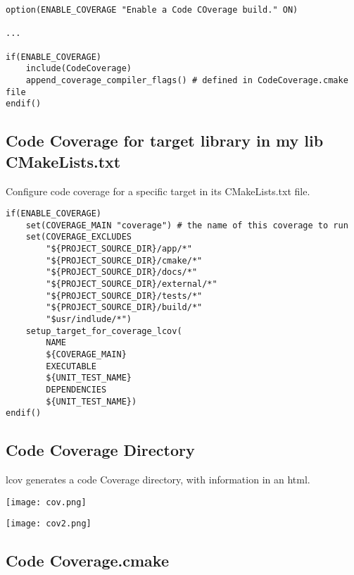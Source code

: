 \begin{verbatim}
option(ENABLE_COVERAGE "Enable a Code COverage build." ON)

...

if(ENABLE_COVERAGE)
    include(CodeCoverage)
    append_coverage_compiler_flags() # defined in CodeCoverage.cmake file
endif()

\end{verbatim}

\subsection{Code Coverage for target library in my lib CMakeLists.txt}

Configure code coverage for a specific target in its CMakeLists.txt file.

\begin{verbatim}
if(ENABLE_COVERAGE)
    set(COVERAGE_MAIN "coverage") # the name of this coverage to run
    set(COVERAGE_EXCLUDES
        "${PROJECT_SOURCE_DIR}/app/*"
        "${PROJECT_SOURCE_DIR}/cmake/*"
        "${PROJECT_SOURCE_DIR}/docs/*"
        "${PROJECT_SOURCE_DIR}/external/*"
        "${PROJECT_SOURCE_DIR}/tests/*"
        "${PROJECT_SOURCE_DIR}/build/*"
        "$usr/indlude/*")
    setup_target_for_coverage_lcov(
        NAME
        ${COVERAGE_MAIN}
        EXECUTABLE
        ${UNIT_TEST_NAME}
        DEPENDENCIES
        ${UNIT_TEST_NAME})
endif()
\end{verbatim}


\subsection{Code Coverage Directory}

lcov generates a code Coverage directory, with information in an html.


\begin{center}
    \texttt{[image: cov.png]}
\end{center}


\begin{center}
    \texttt{[image: cov2.png]}
\end{center}



\subsection{Code Coverage.cmake}

